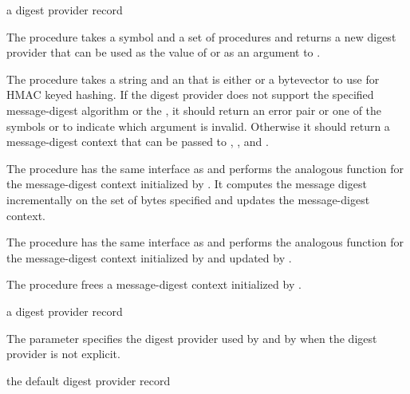 \begin{procedure}
\end{procedure}
\returns{} a digest provider record

The  procedure takes a symbol 
and a set of procedures and returns a new digest provider that can
be used as the value of  or as an
argument to .

The  procedure takes a string  and an 
that is either  or a bytevector to use for HMAC keyed hashing.
If the digest provider does not support the specified message-digest algorithm
 or the , it should return an error pair or one of
the symbols  or  to indicate which argument
is invalid.
Otherwise it should return a message-digest context that can be
passed to , , and .

The  procedure has the same interface as  and
performs the analogous function for the message-digest context initialized by
. It computes the message digest incrementally on the set of bytes
specified and updates the message-digest context.

The  procedure has the same interface as  and
performs the analogous function for the message-digest context initialized by
 and updated by .

The  procedure frees a message-digest context initialized
by .

\begin{parameter}
\end{parameter}
\returns{} a digest provider record

The  parameter specifies the digest provider
used by  and by  when the
digest provider is not explicit.

\begin{binding}
\end{binding}
\returns{} the default digest provider record


